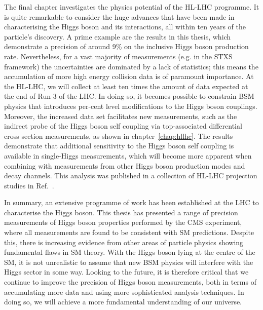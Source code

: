 The final chapter investigates the physics potential of the HL-LHC programme. It is quite remarkable to consider the huge advances that have been made in characterising the Higgs boson and its interactions, all within ten years of the particle's discovery. A prime example are the \Hgg results in this thesis, which demonstrate a precision of around 9\% on the inclusive Higgs boson production rate. Nevertheless, for a vast majority of measurements (e.g. in the STXS framework) the uncertainties are dominated by a lack of statistics; this means the accumulation of more high energy collision data is of paramount importance. At the HL-LHC, we will collect at least ten times the amount of data expected at the end of Run 3 of the LHC. In doing so, it becomes possible to constrain BSM physics that introduces per-cent level modifications to the Higgs boson couplings. Moreover, the increased data set facilitates new measurements, such as the indirect probe of the Higgs boson self coupling via top-associated differential cross section measurements, as shown in chapter~\ref{chap:hllhc}. The results demonstrate that additional sensitivity to the Higgs boson self coupling is available in single-Higgs measurements, which will become more apparent when combining with measurements from other Higgs boson production modes and decay channels. This analysis was published in a collection of HL-LHC projection studies in Ref.~\cite{Cepeda:2019klc}.

In summary, an extensive programme of work has been established at the LHC to characterise the Higgs boson. This thesis has presented a range of precision measurements of Higgs boson properties performed by the CMS experiment, where all measurements are found to be consistent with SM predictions. Despite this, there is increasing evidence from other areas of particle physics showing fundamental flaws in SM theory. With the Higgs boson lying at the centre of the SM, it is not unrealistic to assume that new BSM physics will interfere with the Higgs sector in some way. Looking to the future, it is therefore critical that we continue to improve the precision of Higgs boson measurements, both in terms of accumulating more data and using more sophisticated analysis techniques. In doing so, we will achieve a more fundamental understanding of our universe.